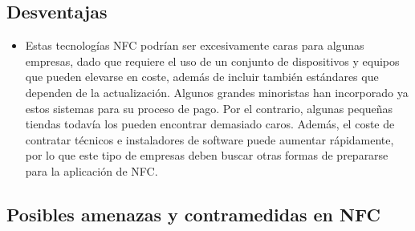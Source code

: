 \documentclass[12pt,a4paper,onecolumn,oneside]{report}
\begin{document}
\subsection{Desventajas}
\begin{itemize}
\item Estas tecnologías NFC podrían ser excesivamente caras para algunas empresas, dado que requiere el uso de un conjunto de dispositivos y equipos que pueden elevarse en coste, además de incluir también estándares que dependen de la actualización. Algunos grandes minoristas han incorporado ya estos sistemas para su proceso de pago. Por el contrario, algunas pequeñas tiendas todavía los pueden encontrar demasiado caros. Además, el coste de contratar técnicos e instaladores de software puede aumentar rápidamente, por lo que este tipo de empresas deben buscar otras formas de prepararse para la aplicación de NFC.
\end{itemize}





\subsection{Posibles amenazas y contramedidas en NFC}
\end{document}
